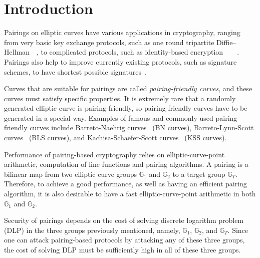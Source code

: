 \section{Introduction}
\label{sec:intro}

Pairings on elliptic curves have various applications in cryptography,
ranging from very basic key exchange protocols,
such as one round tripartite Diffie--Hellman~\cite{2000/joux-ants}~\cite{2004/joux-tripartite},
to complicated protocols, such as
identity-based encryption~\cite{2001/boneh}~\cite{2002/horwitz}~\cite{2002/gentry}~\cite{2005/sahai}.
Pairings also help to improve currently existing protocols, 
such as signature schemes, to have shortest possible signatures~\cite{2004/boneh}.

Curves that are suitable for pairings are called {\emph{pairing-friendly curves}},
and these curves must satisfy specific properties.
It is extremely rare that a randomly generated elliptic curve is pairing-friendly, so pairing-friendly curves have to be generated in a special way.
Examples of famous and commonly used pairing-friendly curves include 
Barreto-Naehrig curves~\cite{2006/barreto} (BN curves),
Barreto-Lynn-Scott curves~\cite{2003/bls} (BLS curves), and
Kachisa-Schaefer-Scott curves~\cite{2008/kss} (KSS curves).

Performance of pairing-based cryptography relies on
elliptic-curve-point arithmetic, computation of line functions and pairing algorithms.
A pairing is a bilinear map from two elliptic curve groups $\mathbb{G}_1$ and $\mathbb{G}_2$ to
a target group $\mathbb{G}_T$.
Therefore, to achieve a good performance, as well as having an efficient pairing algorithm,
it is also desirable to have a fast elliptic-curve-point arithmetic in both $\mathbb{G}_1$ and $\mathbb{G}_2$.

Security of pairings depends on the cost of solving discrete logarithm problem (DLP) in the three groups previously mentioned,
namely, $\mathbb{G}_1$, $\mathbb{G}_2$, and $\mathbb{G}_T$.
Since one can attack pairing-based protocols by attacking any of these three groups,
the cost of solving DLP must be sufficiently high in all of these three groups.

